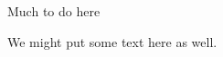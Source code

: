 \documentclass[a4paper,14pt]{scrartcl}
\begin{document}
        \vspace*{10cm}
        \begin{center}Much to do here\end{center}
        \vfill
        \hspace*{5cm}We might put some text here as well.
    
\end{document}
